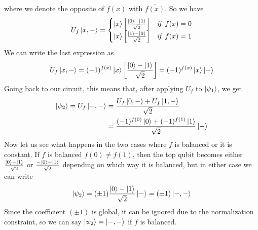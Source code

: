 \documentclass[12pt,a4paper]{report}
\theoremstyle{definition}
\theoremstyle{definition}
\theoremstyle{definition}
\begin{document}
where we denote the opposite of $f(x)$ with $\overline{f(x)}$. So we have
\begin{equation*}
    U_f\ket{x,-}=\begin{cases}
        \ket{x}\left[\frac{\ket{0}-\ket{1}}{\sqrt{2}}\right] & \mathit{if}\ f(x) = 0\\
        \ket{x}\left[\frac{\ket{1}-\ket{0}}{\sqrt{2}}\right] & \mathit{if}\ f(x) = 1\\
    \end{cases}
\end{equation*}
We can write the last expression as
\begin{equation*}
    U_f\ket{x,-}=(-1)^{f(x)}\ket{x}\left[\frac{\ket{0}-\ket{1}}{\sqrt{2}}\right]=(-1)^{f(x)}\ket{x}\ket{-}
\end{equation*}
Going back to our circuit, this means that, after applying $U_f$ to $\ket{\psi_1}$, we get
\begin{align*}
    \ket{\psi_2}=U_f\ket{+,-}&=\frac{U_f\ket{0,-}+U_f\ket{1,-}}{\sqrt{2}}\\
    &=\frac{(-1)^{f(0)}\ket{0}+(-1)^{f(1)}\ket{1}}{\sqrt{2}}\ket{-}
\end{align*}
Now let us see what happens in the two cases where $f$ is balanced or it is constant.
If $f$ is balanced $f(0)\neq f(1)$, then the top qubit becomes either $\frac{\ket{0}-\ket{1}}{\sqrt{2}}$ or $\frac{-\ket{0}+\ket{1}}{\sqrt{2}}$ depending on which way it is balanced, but in either case we can write
\begin{equation*}
    \ket{\psi_2}=(\pm 1)\frac{\ket{0}-\ket{1}}{\sqrt{2}}\ket{-}=(\pm 1)\ket{-,-}
\end{equation*}
Since the coefficient $(\pm 1)$ is global, it can be ignored due to the normalization constraint, so we can say $\ket{\psi_2}=\ket{-,-}$ if $f$ is balanced.
\end{document}
